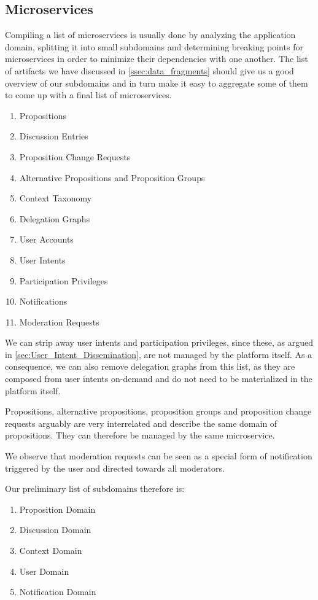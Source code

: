 \subsection{Microservices}
\label{ssec:ApplicationDesign_MS}
Compiling a list of microservices is usually done by analyzing the application domain, splitting it into small subdomains and determining breaking points for microservices in order to minimize their dependencies with one another.
The list of artifacts we have discussed in \autoref{ssec:data_fragments} should give us a good overview of our subdomains and in turn make it easy to aggregate some of them to come up with a final list of microservices.
\begin{enumerate}
  \item Propositions
  \item Discussion Entries
  \item Proposition Change Requests
  \item Alternative Propositions and Proposition Groups
  \item Context Taxonomy
  \item Delegation Graphs
  \item User Accounts
  \item User Intents
  \item Participation Privileges
  \item Notifications
  \item Moderation Requests
\end{enumerate}

We can strip away user intents and participation privileges, since these, as argued in \autoref{sec:User_Intent_Dissemination}, are not managed by the platform itself.
As a consequence, we can also remove delegation graphs from this list, as they are composed from user intents on-demand and do not need to be materialized in the platform itself.

Propositions, alternative propositions, proposition groups and proposition change requests arguably are very interrelated and describe the same domain of propositions.
They can therefore be managed by the same microservice.

We observe that moderation requests can be seen as a special form of notification triggered by the user and directed towards all moderators.

Our preliminary list of subdomains therefore is:
\begin{enumerate}
  \item Proposition Domain
  \item Discussion Domain
  \item Context Domain
  \item User Domain
  \item Notification Domain
\end{enumerate}

